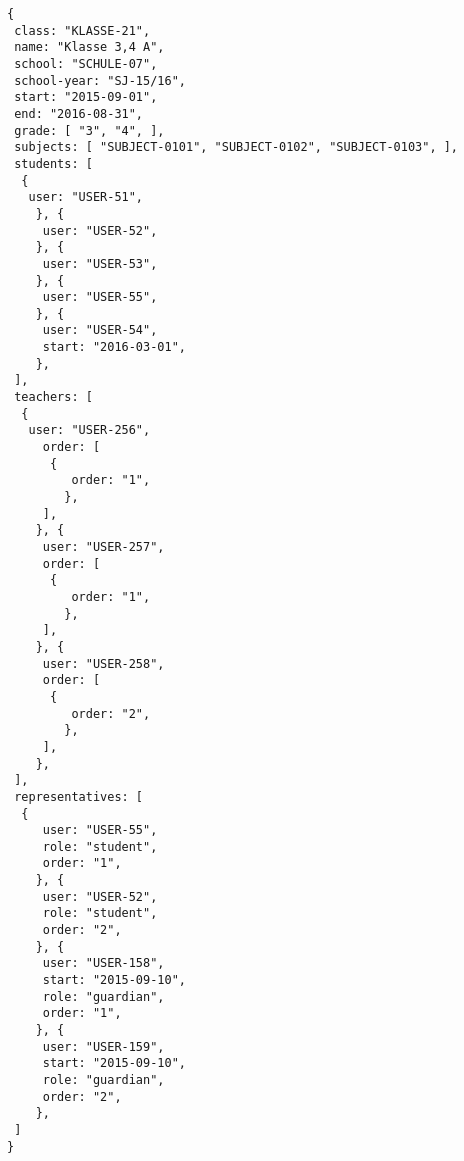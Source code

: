 
\begin{lstlisting}[caption={Klassen-Datenmodell Beispiel 3: Jahrgangsübergreifende Klasse},frame=tlrb]
{
 class: "KLASSE-21",
 name: "Klasse 3,4 A",
 school: "SCHULE-07",
 school-year: "SJ-15/16",
 start: "2015-09-01",
 end: "2016-08-31",
 grade: [ "3", "4", ],
 subjects: [ "SUBJECT-0101", "SUBJECT-0102", "SUBJECT-0103", ],
 students: [
  { 
   user: "USER-51",
	}, { 
	 user: "USER-52",
	}, { 
	 user: "USER-53",
	}, { 
	 user: "USER-55",
	}, { 
	 user: "USER-54",
	 start: "2016-03-01",
	},
 ],
 teachers: [
  { 
   user: "USER-256",
	 order: [
	  {
		 order: "1",
		},
	 ],
	}, { 
	 user: "USER-257",
	 order: [
	  {
		 order: "1",
		},
	 ],
	}, { 
	 user: "USER-258",
	 order: [
	  {
		 order: "2",
		},
	 ],
	},
 ],
 representatives: [
  {
	 user: "USER-55",
	 role: "student",
	 order: "1",	 
	}, {
	 user: "USER-52",
	 role: "student",
	 order: "2",	 
	}, {
	 user: "USER-158",
	 start: "2015-09-10",
	 role: "guardian",
	 order: "1",	 
	}, {
	 user: "USER-159",
	 start: "2015-09-10",
	 role: "guardian",
	 order: "2",	 
	},  
 ]
}
\end{lstlisting}
